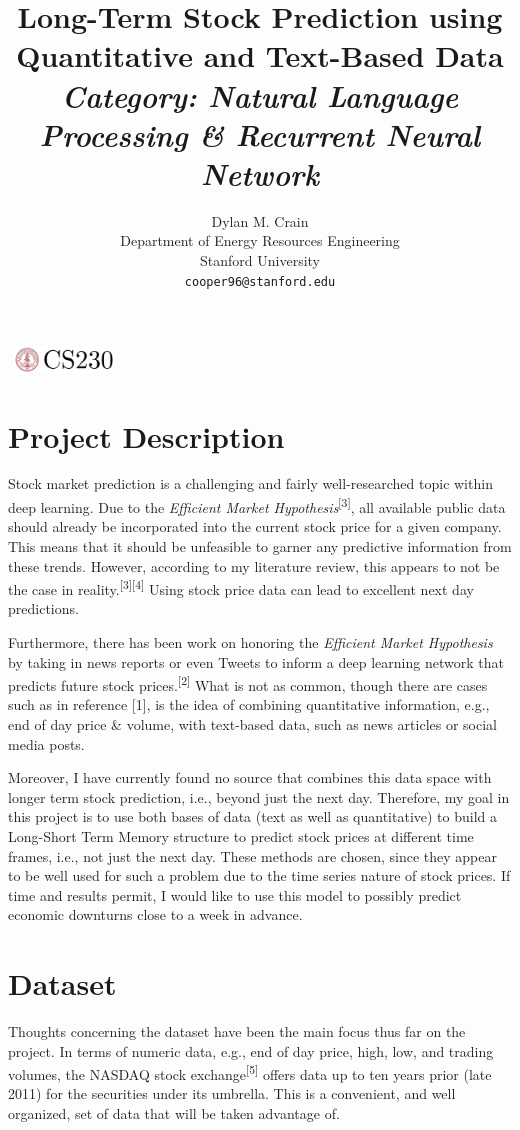 \documentclass{article}
\title{Long-Term Stock Prediction using Quantitative and Text-Based Data\\
       \large\textit{Category: Natural Language Processing \& Recurrent Neural Network}}
\author{
  Dylan M. Crain\\
  Department of Energy Resources Engineering\\
  Stanford University\\
  \texttt{cooper96@stanford.edu} \\
}
\begin{document}
\begin{center}
\includegraphics[width=3cm, height=0.7cm]{CS230}
\end{center}

\maketitle

\section*{Project Description}
Stock market prediction is a challenging
and fairly well-researched topic within deep learning. Due to the
\textit{Efficient Market Hypothesis}\textsuperscript{[3]}, all
available public data should already be incorporated into the current stock
price for a given company. This means that it should be unfeasible to garner any
predictive information from these trends. However, according to my literature
review, this appears to not be the case in reality.\textsuperscript{[3][4]} Using stock price data can lead to
excellent next day predictions.

Furthermore, there has been work on honoring the \textit{Efficient Market
Hypothesis} by taking in news reports or even Tweets to inform a deep learning
network that predicts future stock prices.\textsuperscript{[2]} What is not as common, though there
are cases such as in reference [1], is the idea of combining
quantitative information, e.g., end of day price \& volume, with text-based
data, such as news articles or social media posts.

Moreover, I have currently found no source that combines this data space with longer term stock prediction,
i.e., beyond just the next day. Therefore, my goal in this project is to use
both bases of data (text as well as quantitative) to build a
Long-Short Term Memory structure to predict stock prices
at different time frames, i.e., not just the next day. These methods 
are chosen, since they appear to be well used for such a problem due to the time series
nature of stock prices. If time and results permit, I would
like to use this model to possibly predict economic downturns close to a week in advance.

\section*{Dataset}
Thoughts concerning the dataset have been the main focus thus far on the
project. In terms of numeric data, e.g., end of day price, high, low, and
trading volumes, the NASDAQ stock exchange\textsuperscript{[5]} offers data up to ten years prior
(late 2011) for the securities under its umbrella. This is a convenient, and
well organized, set of data that will be taken advantage of.
\end{document}
